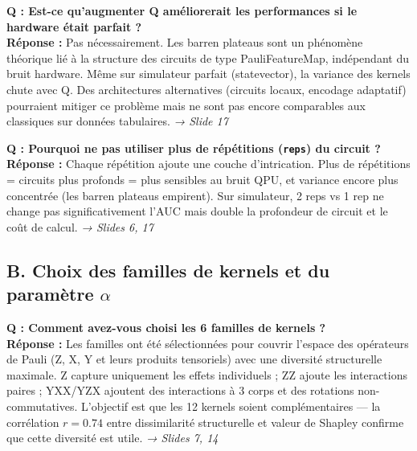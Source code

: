 \documentclass[12pt, a4paper]{article}
\begin{document}
\begin{question}
\textbf{Q : Est-ce qu'augmenter Q améliorerait les performances si le hardware était parfait ?}\\[4pt]
\textbf{Réponse :} Pas nécessairement. Les barren plateaus sont un phénomène théorique
lié à la structure des circuits de type PauliFeatureMap, indépendant du bruit hardware.
Même sur simulateur parfait (statevector), la variance des kernels chute avec Q.
Des architectures alternatives (circuits locaux, encodage adaptatif) pourraient mitiger ce problème
mais ne sont pas encore comparables aux classiques sur données tabulaires.
\hfill\textit{→ Slide 17}
\end{question}

\begin{question}
\textbf{Q : Pourquoi ne pas utiliser plus de répétitions (\texttt{reps}) du circuit ?}\\[4pt]
\textbf{Réponse :} Chaque répétition ajoute une couche d'intrication.
Plus de répétitions = circuits plus profonds = plus sensibles au bruit QPU,
et variance encore plus concentrée (les barren plateaus empirent).
Sur simulateur, 2 reps vs 1 rep ne change pas significativement l'AUC
mais double la profondeur de circuit et le coût de calcul.
\hfill\textit{→ Slides 6, 17}
\end{question}

\subsection*{B. Choix des familles de kernels et du paramètre $\alpha$}

\begin{question}
\textbf{Q : Comment avez-vous choisi les 6 familles de kernels ?}\\[4pt]
\textbf{Réponse :} Les familles ont été sélectionnées pour couvrir l'espace des opérateurs de Pauli
(Z, X, Y et leurs produits tensoriels) avec une diversité structurelle maximale.
Z capture uniquement les effets individuels ; ZZ ajoute les interactions paires ;
YXX/YZX ajoutent des interactions à 3 corps et des rotations non-commutatives.
L'objectif est que les 12 kernels soient complémentaires — la corrélation $r=0.74$
entre dissimilarité structurelle et valeur de Shapley confirme que cette diversité est utile.
\hfill\textit{→ Slides 7, 14}
\end{question}
\end{document}
